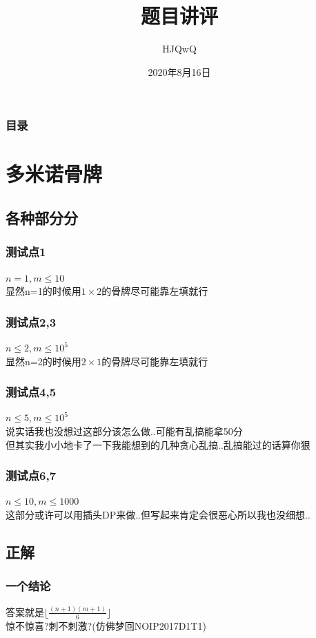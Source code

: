 \documentclass{beamer}
\author{HJQwQ}
\title{题目讲评}
\date{2020年8月16日}
\begin{document}
	\frame{\titlepage}
	\begin{frame}\frametitle{目录}
		\tableofcontents
	\end{frame}
	\section{多米诺骨牌}
		\subsection{各种部分分}
			\begin{frame}\frametitle{测试点1}
				$n=1,m\le10$\\
				显然n=1的时候用$1\times2$的骨牌尽可能靠左填就行
			\end{frame}
			\begin{frame}\frametitle{测试点2,3}
				$n\le2,m\le10^5$\\
				显然n=2的时候用$2\times1$的骨牌尽可能靠左填就行
			\end{frame}
			\begin{frame}\frametitle{测试点4,5}
				$n\le5,m\le10^5$\\
				说实话我也没想过这部分该怎么做..可能有乱搞能拿50分\\
				但其实我小小地卡了一下我能想到的几种贪心乱搞..乱搞能过的话算你狠
			\end{frame}
			\begin{frame}\frametitle{测试点6,7}
				$n\le10,m\le1000$\\
				这部分或许可以用插头DP来做..但写起来肯定会很恶心所以我也没细想..
			\end{frame}
		\subsection{正解}
			\begin{frame}\frametitle{一个结论}
				答案就是$\lfloor\frac{(n+1)(m+1)}6\rfloor$\\
				惊不惊喜?刺不刺激?(仿佛梦回NOIP2017D1T1)
			\end{frame}
\end{document}

